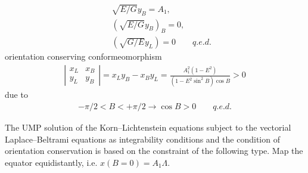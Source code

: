 \documentclass[jog]{svjour}
\begin{document}
\begin{example}
\begin{eqnarray*}
& &\sqrt{{E}/{G}}y_B = A_1, \\
& &(\sqrt{{E}/{G}}y_B)_B = 0, \\
& &(\sqrt{{G}/{E}}y_L) = 0 \qquad q.e.d.
\end{eqnarray*}
orientation conserving conformeomorphism
\begin{eqnarray*}
\left|\begin{array}{cc}
 x_L&x_B\\
 y_L&y_B\end{array}
\right| = x_Ly_B-x_By_L = {\frac{A^2_1(1-E^2)}{(1-E^2\sin^2B)\cos B}>0}
\end{eqnarray*}
due to
\begin{eqnarray*}
-\pi /2<B<+\pi /2 \rightarrow \cos B>0 \qquad q.e.d.
\end{eqnarray*}

The UMP solution of the Korn--Lichtenstein equations subject to the
vectorial Laplace--Beltrami equations as integrability conditions and
the condition of orientation conservation is based on the constraint of
the following type. Map the equator equidistantly, i.e.
$x(B=0)=A_1\Lambda$.
\end{example}
\end{document}
